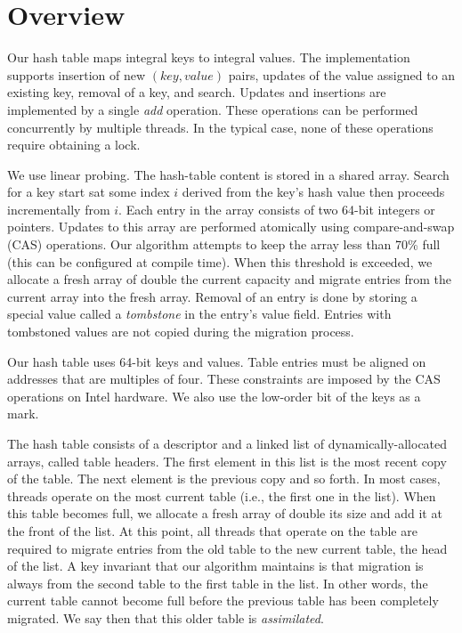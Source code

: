 
\section{Overview}

Our hash table maps integral keys to integral values. The
implementation supports insertion of new $(key,value)$ pairs, updates
of the value assigned to an existing key, removal of a key, and
search. Updates and insertions are implemented by a single {\em add\/}
operation. These operations can be performed concurrently by multiple
threads. In the typical case, none of these operations require
obtaining a lock.

We use linear probing. The hash-table content is stored in a shared
array. Search for a key start sat some index $i$ derived from the
key's hash value then proceeds incrementally from $i$. Each entry in
the array consists of two 64-bit integers or pointers. Updates to this
array are performed atomically using compare-and-swap (CAS)
operations. Our algorithm attempts to keep the array less than 70\%
full (this can be configured at compile time). When this threshold is
exceeded, we allocate a fresh array of double the current capacity and
migrate entries from the current array into the fresh array.  Removal
of an entry is done by storing a special value called a {\em
  tombstone\/} in the entry's value field. Entries with tombstoned
values are not copied during the migration process.




Our hash table uses 64-bit keys and values. Table entries must be
aligned on addresses that are multiples of four. These constraints are
imposed by the CAS operations on Intel hardware. We also use the low-order
bit of the keys as a mark.

The hash table consists of a descriptor and a linked list of
dynamically-allocated arrays, called table headers.  The first element
in this list is the most recent copy of the table. The next element is
the previous copy and so forth.  In most cases, threads operate on the
most current table (i.e., the first one in the list). When this table
becomes full, we allocate a fresh array of double its size and add it
at the front of the list.  At this point, all threads that operate on
the table are required to migrate entries from the old table to the
new current table, the head of the list. A key invariant that our
algorithm maintains is that migration is always from the second table
to the first table in the list. In other words, the current table
cannot become full before the previous table has been completely
migrated.  We say then that this older table is {\em assimilated\/}.

